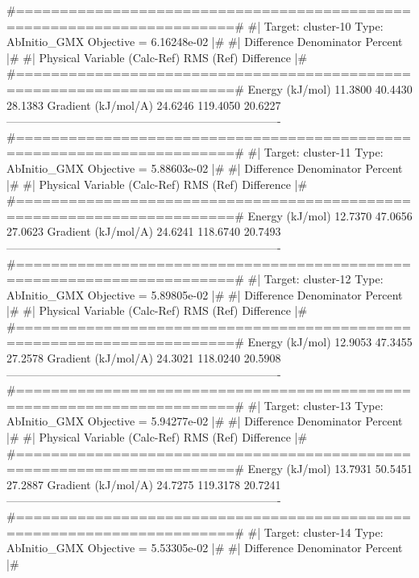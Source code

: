\begin{DoxyVerb}
 #=======================================================================#
 #|  Target: cluster-10 Type: AbInitio_GMX Objective = 6.16248e-02      |#
 #|                              Difference   Denominator     Percent   |#
 #|  Physical Variable           (Calc-Ref)     RMS (Ref)   Difference  |#
 #=======================================================================#
     Energy (kJ/mol)                11.3800       40.4430     28.1383%
     Gradient (kJ/mol/A)            24.6246      119.4050     20.6227%
 -------------------------------------------------------------------------
 #=======================================================================#
 #|  Target: cluster-11 Type: AbInitio_GMX Objective = 5.88603e-02      |#
 #|                              Difference   Denominator     Percent   |#
 #|  Physical Variable           (Calc-Ref)     RMS (Ref)   Difference  |#
 #=======================================================================#
     Energy (kJ/mol)                12.7370       47.0656     27.0623%
     Gradient (kJ/mol/A)            24.6241      118.6740     20.7493%
 -------------------------------------------------------------------------
 #=======================================================================#
 #|  Target: cluster-12 Type: AbInitio_GMX Objective = 5.89805e-02      |#
 #|                              Difference   Denominator     Percent   |#
 #|  Physical Variable           (Calc-Ref)     RMS (Ref)   Difference  |#
 #=======================================================================#
     Energy (kJ/mol)                12.9053       47.3455     27.2578%
     Gradient (kJ/mol/A)            24.3021      118.0240     20.5908%
 -------------------------------------------------------------------------
 #=======================================================================#
 #|  Target: cluster-13 Type: AbInitio_GMX Objective = 5.94277e-02      |#
 #|                              Difference   Denominator     Percent   |#
 #|  Physical Variable           (Calc-Ref)     RMS (Ref)   Difference  |#
 #=======================================================================#
     Energy (kJ/mol)                13.7931       50.5451     27.2887%
     Gradient (kJ/mol/A)            24.7275      119.3178     20.7241%
 -------------------------------------------------------------------------
 #=======================================================================#
 #|  Target: cluster-14 Type: AbInitio_GMX Objective = 5.53305e-02      |#
 #|                              Difference   Denominator     Percent   |#

\end{DoxyVerb}

